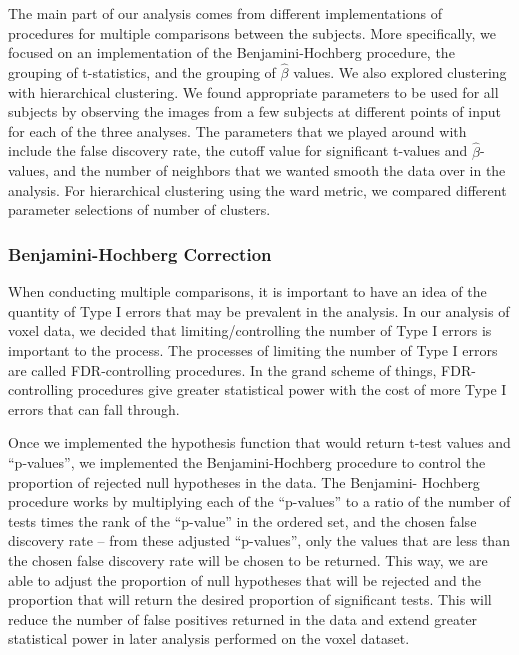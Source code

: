 \par The main part of our analysis comes from different 
implementations of procedures for multiple comparisons between the subjects.
More specifically, we focused on an implementation of the Benjamini-Hochberg 
procedure, the grouping of t-statistics, and the grouping of $\hat{\beta}$ 
values. We also explored clustering with hierarchical clustering. We found 
appropriate parameters to be used for all subjects by observing the images 
from a few subjects at different 
points of input for each of the three analyses. The parameters that we played 
around with include the false discovery rate, the cutoff value for significant 
t-values and $\hat{\beta}$-values, and the number of neighbors that we wanted 
smooth the data over in the analysis. For hierarchical clustering using the 
ward metric, we compared different parameter selections of number of clusters.

\subsubsection{Benjamini-Hochberg Correction}

\par When conducting multiple comparisons, it is important to have an 
idea of the quantity of Type I errors that may be prevalent in the analysis. 
In our analysis of voxel data, we decided that limiting/controlling the number 
of Type I errors is important to the process. The processes of limiting the 
number of Type I errors are called FDR-controlling procedures. In the grand 
scheme of things, FDR-controlling procedures give greater statistical power 
with the cost of more Type I errors that can fall through. 

\par Once we implemented the hypothesis function that would return t-test 
values and ``p-values'', we implemented the Benjamini-Hochberg procedure to 
control the proportion of rejected null hypotheses in the data. The Benjamini-
Hochberg procedure works by multiplying each of the ``p-values'' to a ratio of 
the number of tests times the rank of the ``p-value'' in the ordered set, 
and the chosen false discovery rate -- from these adjusted 
``p-values'', only the values that are less than the chosen false discovery 
rate will be chosen to be returned. This way, we are able to adjust the 
proportion of null hypotheses that will be rejected and the proportion that 
will return the desired proportion of significant tests. This will reduce the
number of false positives returned in the data and extend greater statistical 
power in later analysis performed on the voxel dataset.

